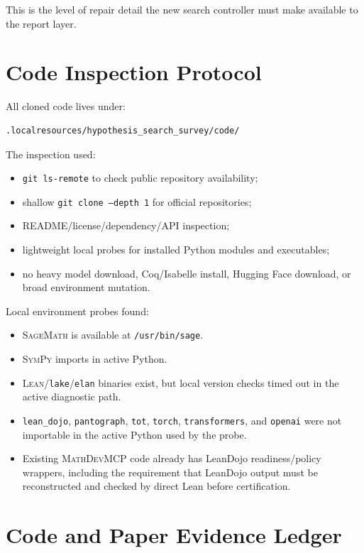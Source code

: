 \documentclass[11pt]{article}
\newcommand{\MathDevMCP}{\textsc{MathDevMCP}}
\newcommand{\Lean}{\textsc{Lean}}
\newcommand{\Sage}{\textsc{SageMath}}
\newcommand{\SymPy}{\textsc{SymPy}}
\begin{document}
This is the level of repair detail the new search controller must make
available to the report layer.

\section{Code Inspection Protocol}

All cloned code lives under:

\begin{verbatim}
.localresources/hypothesis_search_survey/code/
\end{verbatim}

The inspection used:

\begin{itemize}[leftmargin=*]
\item \texttt{git ls-remote} to check public repository availability;
\item shallow \texttt{git clone --depth 1} for official repositories;
\item README/license/dependency/API inspection;
\item lightweight local probes for installed Python modules and executables;
\item no heavy model download, Coq/Isabelle install, Hugging Face download, or
  broad environment mutation.
\end{itemize}

Local environment probes found:

\begin{itemize}[leftmargin=*]
\item \Sage{} is available at \texttt{/usr/bin/sage}.
\item \SymPy{} imports in active Python.
\item \Lean/\texttt{lake}/\texttt{elan} binaries exist, but local version
  checks timed out in the active diagnostic path.
\item \texttt{lean\_dojo}, \texttt{pantograph}, \texttt{tot}, \texttt{torch},
  \texttt{transformers}, and \texttt{openai} were not importable in the active
  Python used by the probe.
\item Existing \MathDevMCP{} code already has LeanDojo readiness/policy
  wrappers, including the requirement that LeanDojo output must be reconstructed
  and checked by direct Lean before certification.
\end{itemize}

\section{Code and Paper Evidence Ledger}
\end{document}
